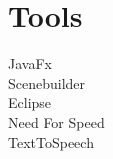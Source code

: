 \documentclass[12pt,a4paper]{scrartcl}
\begin{document}

\section{Tools}
JavaFx\\
Scenebuilder\\
Eclipse\\
Need For Speed\\
TextToSpeech\\
\end{document}
